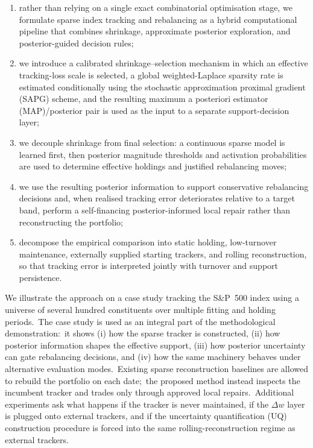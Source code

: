 \documentclass[11pt]{article}
\begin{document}
\begin{enumerate}[label=(A\arabic*),leftmargin=*]
\item rather than relying on a single exact combinatorial optimisation stage, we formulate sparse index tracking and rebalancing as a hybrid computational pipeline that combines shrinkage, approximate posterior exploration, and posterior-guided decision rules;

\item we introduce a calibrated shrinkage--selection mechanism in which an effective tracking-loss scale is selected, a global weighted-Laplace sparsity rate is estimated conditionally using the stochastic approximation proximal gradient (SAPG) scheme, and the resulting maximum a posteriori estimator (MAP)/posterior pair is used as the input to a separate support-decision layer;

\item we decouple shrinkage from final selection: a continuous sparse model is learned first, then posterior magnitude thresholds and activation probabilities are used to determine effective holdings and justified rebalancing moves;

\item we use the resulting posterior information to support conservative rebalancing decisions and, when realised tracking error deteriorates relative to a target band, perform a self-financing posterior-informed local repair rather than reconstructing the portfolio;

\item decompose the empirical comparison into static holding, low-turnover maintenance, externally supplied starting trackers, and rolling reconstruction, so that tracking error is interpreted jointly with turnover and support persistence.
\end{enumerate}


We illustrate the approach on a case study tracking the S\&P~500 index using a universe of several hundred constituents over multiple fitting and holding periods.\ The case study is used as an integral part of the methodological demonstration:\ it shows (i) how the sparse tracker is constructed, (ii) how posterior information shapes the effective support, (iii) how posterior uncertainty can gate rebalancing decisions, and (iv) how the same machinery behaves under alternative evaluation modes.\ Existing sparse reconstruction baselines are allowed to rebuild the portfolio on each date;\ the proposed method instead inspects the incumbent tracker and trades only through approved local repairs.\ Additional experiments ask what happens if the tracker is never maintained, if the $\Delta w$ layer is plugged onto external trackers, and if the uncertainty quantification (UQ) construction procedure is forced into the same rolling-reconstruction regime as external trackers.\\
\end{document}
